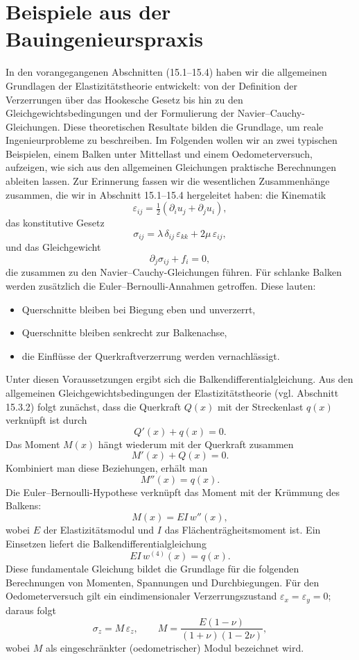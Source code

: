 %
%
%
%
\section{Beispiele aus der Bauingenieurspraxis}
\label{elastomechanik:section:teil4}
In den vorangegangenen Abschnitten (15.1–15.4) haben wir die allgemeinen Grundlagen der Elastizitätstheorie entwickelt: 
von der Definition der Verzerrungen über das Hookesche Gesetz bis hin zu den Gleichgewichtsbedingungen und der Formulierung der Navier--Cauchy-Gleichungen. 
Diese theoretischen Resultate bilden die Grundlage, um reale Ingenieurprobleme zu beschreiben. 
Im Folgenden wollen wir an zwei typischen Beispielen, einem Balken unter Mittellast und einem Oedometerversuch, aufzeigen, wie sich aus den allgemeinen Gleichungen praktische Berechnungen ableiten lassen. 
Zur Erinnerung fassen wir die wesentlichen Zusammenhänge zusammen, die wir in Abschnitt 15.1–15.4 hergeleitet haben:
die Kinematik
\[
  \varepsilon_{ij} = \tfrac12(\partial_i u_j + \partial_j u_i),
\]
das konstitutive Gesetz
\[
  \sigma_{ij} = \lambda\, \delta_{ij}\,\varepsilon_{kk} + 2\mu\, \varepsilon_{ij},
\]
und das Gleichgewicht
\[
  \partial_j \sigma_{ij} + f_i = 0,
\]
die zusammen zu den Navier--Cauchy-Gleichungen führen.
Für schlanke Balken werden zusätzlich die Euler–Bernoulli-Annahmen getroffen. 
Diese lauten:
\begin{itemize}
  \item Querschnitte bleiben bei Biegung eben und unverzerrt,
  \item Querschnitte bleiben senkrecht zur Balkenachse,
  \item die Einflüsse der Querkraftverzerrung werden vernachlässigt.
\end{itemize}
Unter diesen Voraussetzungen ergibt sich die Balkendifferentialgleichung. 
Aus den allgemeinen Gleichgewichtsbedingungen der Elastizitätstheorie 
(vgl. Abschnitt 15.3.2) folgt zunächst, dass die Querkraft \(Q(x)\) mit der 
Streckenlast \(q(x)\) verknüpft ist durch
\[
  Q'(x) + q(x) = 0.
\]
Das Moment \(M(x)\) hängt wiederum mit der Querkraft zusammen
\[
  M'(x) + Q(x) = 0.
\]
Kombiniert man diese Beziehungen, erhält man
\[
  M''(x) = q(x).
\]
Die Euler–Bernoulli-Hypothese verknüpft das Moment mit der 
Krümmung des Balkens:
\[
  M(x) = EI\,w''(x),
\]
wobei \(E\) der Elastizitätsmodul und \(I\) das Flächenträgheitsmoment ist. 
Ein Einsetzen liefert die Balkendifferentialgleichung
\begin{equation}
  EI\,w^{(4)}(x) = q(x).
  \label{eq:beam_dgl}
\end{equation}
Diese fundamentale Gleichung bildet die Grundlage für die folgenden 
Berechnungen von Momenten, Spannungen und Durchbiegungen.
Für den Oedometerversuch gilt ein eindimensionaler Verzerrungszustand
\(\varepsilon_x=\varepsilon_y=0\); daraus folgt
\[
  \sigma_z = M \,\varepsilon_z, \qquad
  M=\frac{E(1-\nu)}{(1+\nu)(1-2\nu)},
\]
wobei \(M\) als eingeschränkter (oedometrischer) Modul bezeichnet wird.

